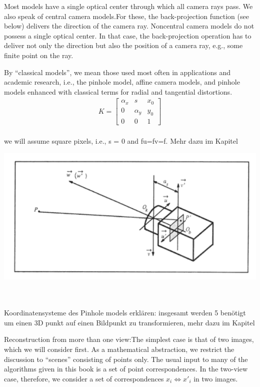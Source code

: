 Most models
have a single optical center through which all camera rays pass. We
also speak of central camera models.For these, the back-projection
function (see below) delivers the direction of the camera ray. Noncentral
camera models do not possess a single optical center. In
that case, the back-projection operation has to deliver not only the
direction but also the position of a camera ray, e.g., some finite point
on the ray.\cite{CamerModels.}

By “classical models”, we mean those used most often in applications
and academic research, i.e., the pinhole model, affine camera models,
and pinhole models enhanced with classical terms for radial and tangential
distortions.\cite{CamerModels.}\\

	\begin{gather}
K=\begin{bmatrix}
\alpha_x&s&x_{0}\\
0&\alpha_y&y_{0}\\
0&0&1
\end{bmatrix}
\end{gather}\\

we will assume square pixels, i.e., s = 0 and fu=fv=f. Mehr dazu im Kapitel 

	\begin{minipage}{\linewidth}
	\centering
	\includegraphics[width=.8\linewidth]{images/kameramodell_vorlaeufig.png}
	\label{fig:PinholeCamera}
\end{minipage}\\ \\

Koordinatensysteme des Pinhole models erklären: insgesamt werden 5 benötigt um einen 3D punkt auf einen Bildpunkt zu transformieren, mehr dazu im Kapitel 

Reconstruction from more than one view:The simplest case is that of two images, which we will consider
first. As a mathematical abstraction, we restrict the discussion to “scenes” consisting of points only.
The usual input to many of the algorithms given in this book is a set of point correspondences.
In the two-view case, therefore, we consider a set of correspondences $x_i \Leftrightarrow x'_i$ in two images.

